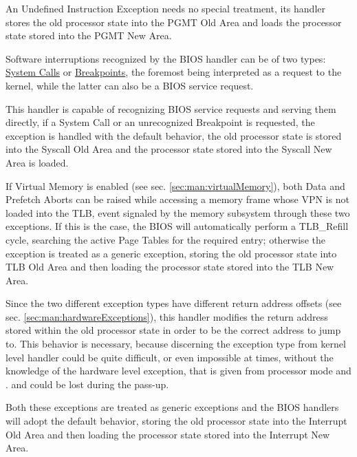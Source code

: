 An Undefined Instruction Exception needs no special treatment, its handler stores the old processor state into the PGMT Old Area and loads the processor state stored into the PGMT New Area.


Software interruptions recognized by the BIOS handler can be of two types: \uline{System Calls} or \uline{Breakpoints}, the foremost being interpreted as a request to the kernel, while the latter can also be a BIOS service request.

This handler is capable of recognizing BIOS service requests and serving them directly, if a System Call or an unrecognized Breakpoint is requested, the exception is handled with the default behavior, the old processor state is stored into the Syscall Old Area and the processor state stored into the Syscall New Area is loaded.


If Virtual Memory is enabled (see sec. \ref{sec:man:virtualMemory}), both Data and Prefetch Aborts can be raised while accessing a memory frame whose VPN is not loaded into the TLB, event signaled by the memory subsystem through these two exceptions.
If this is the case, the BIOS will automatically perform a TLB\_Refill cycle, searching the active Page Tables for the required entry; otherwise the exception is treated as a generic exception, storing the old processor state into TLB Old Area and then loading the processor state stored into the TLB New Area.

Since the two different exception types have different return address offsets (see sec. \ref{sec:man:hardwareExceptions}), this handler modifies the return address stored within the old processor state in order to be the correct address to jump to.
This behavior is necessary, because discerning the exception type from kernel level handler could be quite difficult, or even impossible at times, without the knowledge of the hardware level exception, that is given from processor mode and . and could be lost during the pass-up.


Both these exceptions are treated as generic exceptions and the BIOS handlers will adopt the default behavior, storing the old processor state into the Interrupt Old Area and then loading the processor state stored into the Interrupt New Area.


